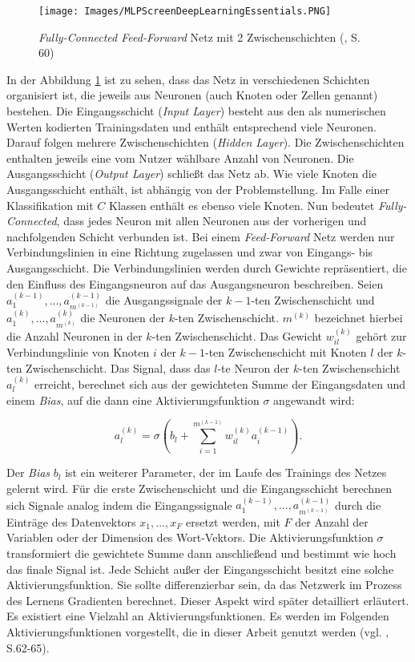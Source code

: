 \documentclass[a4paper,11pt]{article}
\begin{document}
\begin{figure}[!ht]
\begin{center}
\texttt{[image: Images/MLPScreenDeepLearningEssentials.PNG]}
\caption{\textit{Fully-Connected Feed-Forward} Netz mit 2 Zwischenschichten (\cite{deepEssentials}, S. 60)}
\label{abb:MLPScreen}
\end{center}
\end{figure}

In der Abbildung \ref{abb:MLPScreen} ist zu sehen, dass das Netz in verschiedenen Schichten organisiert ist, die jeweils aus Neuronen (auch Knoten oder Zellen genannt) bestehen. Die Eingangsschicht (\textit{Input Layer}) besteht aus den als numerischen Werten kodierten Trainingsdaten und enthält entsprechend viele Neuronen. Darauf folgen mehrere Zwischenschichten (\textit{Hidden Layer}). Die Zwischenschichten enthalten jeweils eine vom Nutzer wählbare Anzahl von Neuronen. Die Ausgangsschicht (\textit{Output Layer}) schließt das Netz ab. Wie viele Knoten die Ausgangsschicht enthält, ist abhängig von der Problemstellung. Im Falle einer Klassifikation mit $C$ Klassen enthält es ebenso viele Knoten. Nun bedeutet \textit{Fully-Connected}, dass jedes Neuron mit allen Neuronen aus der vorherigen und nachfolgenden Schicht verbunden ist. Bei einem \textit{Feed-Forward} Netz werden nur Verbindungslinien in eine Richtung zugelassen und zwar von Eingangs- bis Ausgangsschicht. Die Verbindungslinien werden durch Gewichte repräsentiert, die den Einfluss des Eingangsneuron auf das Ausgangsneuron beschreiben. Seien $a_1^{(k-1)},..., a_{m^{(k-1)}}^{(k-1)}$ die Ausgangssignale der $k-1$-ten Zwischenschicht und $a_{1}^{(k)},..., a_{m^{(k)}}^{(k)}$ die Neuronen der $k$-ten Zwischenschicht. $m^{(k)}$ bezeichnet hierbei die Anzahl Neuronen in der $k$-ten Zwischenschicht. 
Das Gewicht $w_{il}^{(k)}$ gehört zur Verbindungslinie von Knoten $i$ der $k-1$-ten Zwischenschicht mit Knoten $l$ der $k$-ten Zwischenschicht. Das Signal, dass das $l$-te Neuron der $k$-ten Zwischenschicht $a_{l}^{(k)}$ erreicht, berechnet sich aus der gewichteten Summe der Eingangsdaten und einem \textit{Bias}, auf die dann eine Aktivierungsfunktion $\sigma$ angewandt wird:

\[ a_{l}^{(k)} = \sigma (b_l + \sum_{i=1}^{m^{(k-1)}} w_{il}^{(k)} a_{i}^{(k-1)}).\]

Der \textit{Bias} $b_l$ ist ein weiterer Parameter, der im Laufe des Trainings des Netzes gelernt wird.
Für die erste Zwischenschicht und die Eingangsschicht berechnen sich Signale analog indem die Eingangssignale $a_{1}^{(k-1)},..., a_{m^{(k-1)}}^{(k-1)}$ durch die Einträge des Datenvektors $x_1, ..., x_F$ ersetzt werden, mit $F$ der Anzahl der Variablen oder der Dimension des Wort-Vektors. Die Aktivierungsfunktion $\sigma$ transformiert die gewichtete Summe dann anschließend und bestimmt wie hoch das finale Signal ist. Jede Schicht außer der Eingangsschicht besitzt eine solche Aktivierungsfunktion. Sie sollte differenzierbar sein, da das Netzwerk im Prozess des Lernens Gradienten berechnet. Dieser Aspekt wird später detailliert erläutert. Es existiert eine Vielzahl an Aktivierungsfunktionen. Es werden im Folgenden Aktivierungsfunktionen vorgestellt, die in dieser Arbeit genutzt werden (vgl. \cite{deepEssentials}, S.62-65). 
\end{document}
